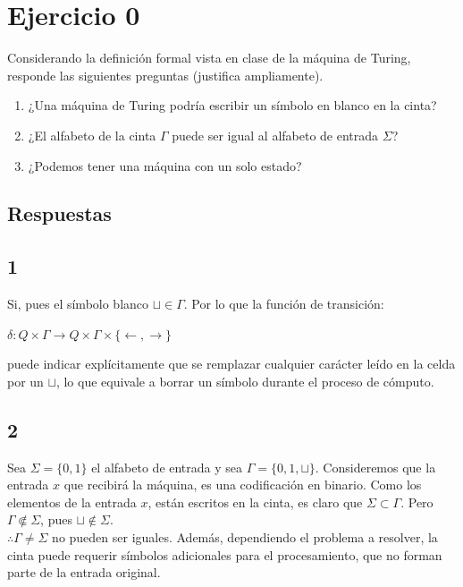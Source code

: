 \section{Ejercicio 0}


\begin{tcolorbox}[enunciado]
Considerando la definición formal vista en clase de la máquina de Turing, responde las siguientes preguntas (justifica ampliamente).
\begin{enumerate}
    \item ¿Una máquina de Turing podría escribir un símbolo en blanco en la cinta?
    \item ¿El alfabeto de la cinta $\Gamma$ puede ser igual al alfabeto de entrada $\Sigma$?
    \item ¿Podemos tener una máquina con un solo estado?
\end{enumerate}
\end{tcolorbox}

\subsection{Respuestas}
\subsection{1} Si, pues el símbolo blanco $\sqcup\in\Gamma$. Por lo que la función de transición:
\begin{center}
    $\delta :Q\times\Gamma\rightarrow Q\times\Gamma \times \{\leftarrow, \rightarrow\}$
\end{center}puede indicar explícitamente que se remplazar cualquier carácter leído en la celda por un $\sqcup$, lo que equivale a borrar un símbolo durante el proceso de cómputo.


\subsection{2}
Sea $\Sigma = \{ 0,1\}$ el alfabeto de entrada y sea $\Gamma= \{0,1,\sqcup\}$. Consideremos que la entrada $x$ que recibirá la máquina, es una codificación en binario. Como los elementos de la entrada $x$, están escritos en la cinta, es claro que $\Sigma\subset\Gamma$. Pero $\Gamma\not\Subset\Sigma$, pues $\sqcup\notin\Sigma$.\\
$\therefore \Gamma \ne\Sigma$ no pueden ser iguales. Además, dependiendo el problema a resolver, la cinta puede requerir símbolos adicionales para el procesamiento, que no forman parte de la entrada original.


